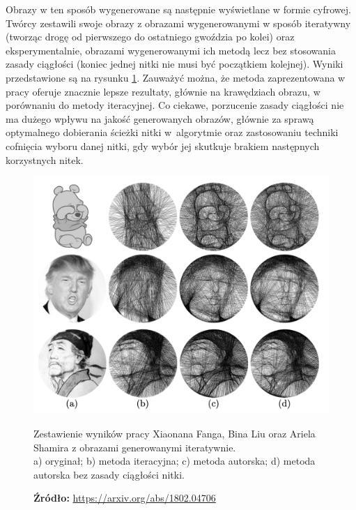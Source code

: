         Obrazy w ten sposób wygenerowane są następnie wyświetlane w formie cyfrowej. Twórcy zestawili swoje obrazy z obrazami wygenerowanymi w sposób iteratywny (tworząc drogę od pierwszego do ostatniego gwoździa po kolei) oraz eksperymentalnie, obrazami wygenerowanymi ich metodą lecz bez stosowania zasady ciągłości (koniec jednej nitki nie musi być początkiem kolejnej). Wyniki przedstawione są na rysunku \ref{przyklad-testowy-xin}. Zauważyć można, że metoda zaprezentowana w pracy oferuje znacznie lepsze rezultaty, głównie na krawędziach obrazu, w porównaniu do metody iteracyjnej. Co ciekawe, porzucenie zasady ciągłości nie ma dużego wpływu na jakość generowanych obrazów, głównie za sprawą optymalnego dobierania ścieżki nitki w~algorytmie oraz zastosowaniu techniki cofnięcia wyboru danej nitki, gdy wybór jej skutkuje brakiem następnych korzystnych nitek. 
        \begin{figure}[htb]
            \centering
            \includegraphics[width=\textwidth,keepaspectratio]{img/3-others/xin-vs-greedy.png}
            \caption[Zestawienie wyników pracy Xiaonana Fanga, Bina Liu oraz Ariela Shamira z obrazami generowanymi iteratywnie.]{Zestawienie wyników pracy Xiaonana Fanga, Bina Liu oraz Ariela Shamira z obrazami generowanymi iteratywnie. \\ a) oryginał; b) metoda iteracyjna; c) metoda autorska; d) metoda autorska bez zasady ciągłości nitki.}
            \caption*{\footnotesize{\textbf{Źródło:} {\url{https://arxiv.org/abs/1802.04706}}}}
            \label{przyklad-testowy-xin}
        \end{figure}
            
